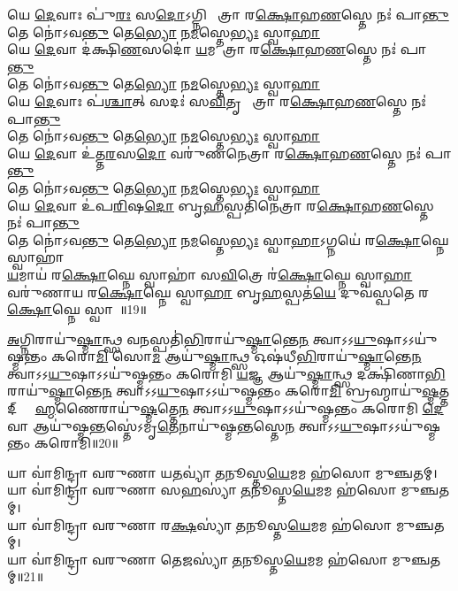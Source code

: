 𑌯𑍇 \ul{𑌦𑍇}𑌵𑌾𑌃 𑌪𑍁॑\ul{𑌰𑌃} 𑌸\ul{𑌦𑍋}𑌽𑌗𑍍𑌨𑌿 𑌨𑍇᳚𑌤𑍍𑌰𑌾 𑌰\ul{𑌕𑍍𑌷𑍋}𑌹\ul{𑌣}𑌸𑍍𑌤𑍇 𑌨𑌃॑ 𑌪𑌾\ul{𑌨𑍍𑌤𑍁}\\
𑌤𑍇 𑌨𑍋॑𑌽𑌵\ul{𑌨𑍍𑌤𑍁}  𑌤𑍇\ul{𑌭𑍍𑌯𑍋} 𑌨\ul{𑌮}𑌸𑍍𑌤𑍇\ul{𑌭𑍍𑌯𑌃} 𑌸𑍍𑌵𑌾\ul{𑌹𑌾}\\
𑌯𑍇 \ul{𑌦𑍇}𑌵𑌾 𑌦॑𑌕𑍍𑌷𑌿\ul{𑌣}𑌸𑌦𑍋॑ \ul{𑌯}𑌮𑌨𑍇᳚𑌤𑍍𑌰𑌾 𑌰\ul{𑌕𑍍𑌷𑍋}𑌹\ul{𑌣}𑌸𑍍𑌤𑍇 𑌨𑌃॑ 𑌪𑌾\ul{𑌨𑍍𑌤𑍁}\\
𑌤𑍇 𑌨𑍋॑𑌽𑌵\ul{𑌨𑍍𑌤𑍁}  𑌤𑍇\ul{𑌭𑍍𑌯𑍋} 𑌨\ul{𑌮}𑌸𑍍𑌤𑍇\ul{𑌭𑍍𑌯𑌃} 𑌸𑍍𑌵𑌾\ul{𑌹𑌾}\\
𑌯𑍇 \ul{𑌦𑍇}𑌵𑌾𑌃 𑌪॑\ul{𑌶𑍍𑌚𑌾}𑌤𑍍 𑌸𑌦𑌃॑ 𑌸\ul{𑌵𑌿}𑌤𑍃 𑌨𑍇᳚𑌤𑍍𑌰𑌾 𑌰\ul{𑌕𑍍𑌷𑍋}𑌹\ul{𑌣}𑌸𑍍𑌤𑍇 𑌨𑌃॑ 𑌪𑌾\ul{𑌨𑍍𑌤𑍁}\\
𑌤𑍇 𑌨𑍋॑𑌽𑌵\ul{𑌨𑍍𑌤𑍁}  𑌤𑍇\ul{𑌭𑍍𑌯𑍋} 𑌨\ul{𑌮}𑌸𑍍𑌤𑍇\ul{𑌭𑍍𑌯𑌃} 𑌸𑍍𑌵𑌾\ul{𑌹𑌾}\\
𑌯𑍇 \ul{𑌦𑍇}𑌵𑌾 𑌉॑𑌤𑍍𑌤\ul{𑌰}𑌸\ul{𑌦𑍋} 𑌵𑌰𑍁॑𑌣𑌨𑍇𑌤𑍍𑌰𑌾 𑌰\ul{𑌕𑍍𑌷𑍋}𑌹\ul{𑌣}𑌸𑍍𑌤𑍇 𑌨𑌃॑ 𑌪𑌾\ul{𑌨𑍍𑌤𑍁}\\
𑌤𑍇 𑌨𑍋॑𑌽𑌵\ul{𑌨𑍍𑌤𑍁}  𑌤𑍇\ul{𑌭𑍍𑌯𑍋} 𑌨\ul{𑌮}𑌸𑍍𑌤𑍇\ul{𑌭𑍍𑌯𑌃} 𑌸𑍍𑌵𑌾\ul{𑌹𑌾}\\
𑌯𑍇 \ul{𑌦𑍇}𑌵𑌾 𑌉॑𑌪\ul{𑌰𑌿}𑌷\ul{𑌦𑍋} 𑌬𑍃\ul{𑌹}𑌸𑍍𑌪𑌤𑌿॑𑌨𑍇𑌤𑍍𑌰𑌾 𑌰\ul{𑌕𑍍𑌷𑍋}𑌹\ul{𑌣}𑌸𑍍𑌤𑍇 𑌨𑌃॑ 𑌪𑌾\ul{𑌨𑍍𑌤𑍁}\\
𑌤𑍇 𑌨𑍋॑𑌽𑌵\ul{𑌨𑍍𑌤𑍁}  𑌤𑍇\ul{𑌭𑍍𑌯𑍋} 𑌨\ul{𑌮}𑌸𑍍𑌤𑍇\ul{𑌭𑍍𑌯𑌃} 𑌸𑍍𑌵𑌾\ul{𑌹𑌾}𑌽𑌗𑍍𑌨𑌯𑍇॑ 𑌰\ul{𑌕𑍍𑌷𑍋}𑌘𑍍𑌨𑍇 𑌸𑍍𑌵𑌾𑌹𑌾॑\\
\ul{𑌯}𑌮𑌾𑌯॑ 𑌰\ul{𑌕𑍍𑌷𑍋}𑌘𑍍𑌨𑍇 𑌸𑍍𑌵𑌾𑌹𑌾॑ 𑌸\ul{𑌵𑌿}𑌤𑍍𑌰𑍇 𑌰॑\ul{𑌕𑍍𑌷𑍋}𑌘𑍍𑌨𑍇 𑌸𑍍𑌵𑌾\ul{𑌹𑌾}\\
𑌵𑌰𑍁॑𑌣𑌾𑌯 𑌰\ul{𑌕𑍍𑌷𑍋}𑌘𑍍𑌨𑍇 𑌸𑍍𑌵𑌾\ul{𑌹𑌾} 𑌬𑍃\ul{𑌹}𑌸𑍍𑌪𑌤॑\ul{𑌯𑍇} 𑌦𑍁𑌵॑𑌸𑍍𑌪𑌤𑍇 𑌰\ul{𑌕𑍍𑌷𑍋}𑌘𑍍𑌨𑍇 𑌸𑍍𑌵𑌾𑌹𑌾᳚॥19॥

\ul{𑌅}𑌗𑍍𑌨𑌿𑌰𑌾𑌯𑍁॑\ul{𑌷𑍍𑌮𑌾}𑌨𑍍𑌥𑍍𑌸 𑌵\ul{𑌨}𑌸𑍍𑌪𑌤𑌿॑\ul{𑌭𑌿}𑌰𑌾𑌯𑍁॑\ul{𑌷𑍍𑌮𑌾}𑌨𑍍𑌤𑍇\ul{𑌨} 𑌤𑍍𑌵𑌾𑌽𑌽\ul{𑌯𑍁}𑌷𑌾\-𑌽𑌽𑌯𑍁॑𑌷𑍍𑌮𑌨𑍍𑌤𑌂 𑌕𑌰𑍋\ul{𑌮𑌿}
𑌸𑍋\ul{𑌮} 𑌆𑌯𑍁॑\ul{𑌷𑍍𑌮𑌾}𑌨𑍍𑌥𑍍𑌸 𑌓𑌷॑𑌧𑍀\ul{𑌭𑌿}𑌰𑌾𑌯𑍁॑\ul{𑌷𑍍𑌮𑌾}𑌨𑍍𑌤𑍇\ul{𑌨} 𑌤𑍍𑌵𑌾𑌽𑌽\ul{𑌯𑍁}𑌷𑌾\-𑌽𑌽𑌯𑍁॑𑌷𑍍𑌮𑌨𑍍𑌤𑌂 𑌕𑌰𑍋𑌮𑌿
\ul{𑌯}𑌜𑍍𑌞 𑌆𑌯𑍁॑\ul{𑌷𑍍𑌮𑌾}𑌨𑍍𑌥𑍍𑌸 𑌦𑌕𑍍𑌷𑌿॑𑌣𑌾\ul{𑌭𑌿}𑌰𑌾𑌯𑍁॑\ul{𑌷𑍍𑌮𑌾}𑌨𑍍𑌤𑍇\ul{𑌨} 𑌤𑍍𑌵𑌾𑌽𑌽\ul{𑌯𑍁}𑌷𑌾\-𑌽𑌽𑌯𑍁॑𑌷𑍍𑌮𑌨𑍍𑌤𑌂 𑌕𑌰𑍋\ul{𑌮𑌿}
𑌬𑍍𑌰𑌹𑍍𑌮𑌾𑌯𑍁॑\ul{𑌷𑍍𑌮}𑌤𑍍𑌤𑌦𑍍 𑌬𑍍𑌰𑌾᳚\ul{𑌹𑍍𑌮}𑌣𑍈𑌰𑌾𑌯𑍁॑\ul{𑌷𑍍𑌮}𑌤𑍍𑌤𑍇\ul{𑌨} 𑌤𑍍𑌵𑌾𑌽𑌽\ul{𑌯𑍁}𑌷𑌾\-𑌽𑌽𑌯𑍁॑𑌷𑍍𑌮𑌨𑍍𑌤𑌂 𑌕𑌰𑍋𑌮𑌿
\ul{𑌦𑍇}𑌵𑌾 𑌆𑌯𑍁॑𑌷𑍍𑌮\ul{𑌨𑍍𑌤}𑌸𑍍𑌤𑍇॑𑌽𑌮𑍃\ul{𑌤𑍇}𑌨𑌾𑌯𑍁॑𑌷𑍍𑌮\ul{𑌨𑍍𑌤}𑌸𑍍𑌤𑍇\ul{𑌨} 𑌤𑍍𑌵𑌾\-𑌽𑌽\ul{𑌯𑍁}𑌷𑌾𑌽𑌽𑌯𑍁॑𑌷𑍍𑌮𑌨𑍍𑌤𑌂 𑌕𑌰𑍋𑌮𑌿॥20॥

𑌯𑌾 𑌵𑌾॑𑌮𑌿𑌨𑍍𑌦𑍍𑌰𑌾 𑌵𑌰𑍁𑌣𑌾 𑌯\ul{𑌤}𑌵𑍍𑌯𑌾॑ \ul{𑌤}𑌨𑍂𑌸𑍍𑌤\ul{𑌯𑍇}𑌮𑌮 𑌹॑𑌸𑍋 𑌮𑍁𑌞𑍍𑌚𑌤𑌮𑍍।\\
𑌯𑌾 𑌵𑌾॑𑌮𑌿𑌨𑍍𑌦𑍍𑌰𑌾 𑌵𑌰𑍁𑌣𑌾 𑌸\ul{𑌹}𑌸𑍍𑌯𑌾॑ \ul{𑌤}𑌨𑍂𑌸𑍍𑌤\ul{𑌯𑍇}𑌮𑌮 𑌹॑𑌸𑍋 𑌮𑍁𑌞𑍍𑌚𑌤𑌮𑍍।\\
𑌯𑌾 𑌵𑌾॑𑌮𑌿𑌨𑍍𑌦𑍍𑌰𑌾 𑌵𑌰𑍁𑌣𑌾 𑌰\ul{𑌕𑍍𑌷}𑌸𑍍𑌯𑌾॑ \ul{𑌤}𑌨𑍂𑌸𑍍𑌤\ul{𑌯𑍇}𑌮𑌮 𑌹॑𑌸𑍋 𑌮𑍁𑌞𑍍𑌚𑌤𑌮𑍍।\\
𑌯𑌾 𑌵𑌾॑𑌮𑌿𑌨𑍍𑌦𑍍𑌰𑌾 𑌵𑌰𑍁𑌣𑌾 𑌤𑍇\ul{𑌜}𑌸𑍍𑌯𑌾॑ \ul{𑌤}𑌨𑍂𑌸𑍍𑌤\ul{𑌯𑍇}𑌮𑌮 𑌹॑𑌸𑍋 𑌮𑍁𑌞𑍍𑌚𑌤𑌮𑍍॥21॥

